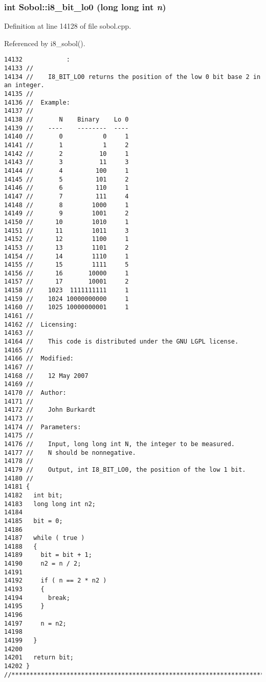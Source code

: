 \subsubsection{\setlength{\rightskip}{0pt plus 5cm}int Sobol::i8\_\-bit\_\-lo0 (long long int {\em n})}\label{namespaceSobol_9f619ae932155d020d4b69c3562884f4}




Definition at line 14128 of file sobol.cpp.

Referenced by i8\_\-sobol().

\begin{Code}\begin{verbatim}14132            :
14133 //
14134 //    I8_BIT_LO0 returns the position of the low 0 bit base 2 in an integer.
14135 //
14136 //  Example:
14137 //
14138 //       N    Binary    Lo 0
14139 //    ----    --------  ----
14140 //       0           0     1
14141 //       1           1     2
14142 //       2          10     1
14143 //       3          11     3 
14144 //       4         100     1
14145 //       5         101     2
14146 //       6         110     1
14147 //       7         111     4
14148 //       8        1000     1
14149 //       9        1001     2
14150 //      10        1010     1
14151 //      11        1011     3
14152 //      12        1100     1
14153 //      13        1101     2
14154 //      14        1110     1
14155 //      15        1111     5
14156 //      16       10000     1
14157 //      17       10001     2
14158 //    1023  1111111111     1
14159 //    1024 10000000000     1
14160 //    1025 10000000001     1
14161 //
14162 //  Licensing:
14163 //
14164 //    This code is distributed under the GNU LGPL license. 
14165 //
14166 //  Modified:
14167 //
14168 //    12 May 2007
14169 //
14170 //  Author:
14171 //
14172 //    John Burkardt
14173 //
14174 //  Parameters:
14175 //
14176 //    Input, long long int N, the integer to be measured.
14177 //    N should be nonnegative.
14178 //
14179 //    Output, int I8_BIT_LO0, the position of the low 1 bit.
14180 //
14181 {
14182   int bit;
14183   long long int n2;
14184 
14185   bit = 0;
14186 
14187   while ( true )
14188   {
14189     bit = bit + 1;
14190     n2 = n / 2;
14191 
14192     if ( n == 2 * n2 )
14193     {
14194       break;
14195     }
14196 
14197     n = n2;
14198 
14199   }
14200 
14201   return bit;
14202 }
//****************************************************************************80
\end{verbatim}
\end{Code}


